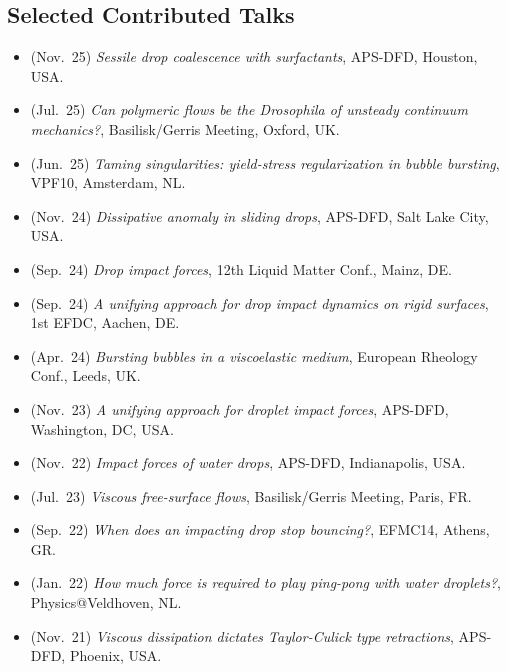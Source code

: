 \documentclass[10pt,a4paper,colorlinks,linkcolor=blue,urlcolor=blue,citecolor=blue]{moderncv}
\begin{document}
\subsection{\faComments\hspace{0.3em}Selected Contributed Talks}
\begin{itemize}[leftmargin=1.5em]
\item[\textbullet] (Nov.~25) \emph{Sessile drop coalescence with surfactants}, APS-DFD, Houston, USA.
\item[\textbullet] (Jul.~25) \emph{Can polymeric flows be the Drosophila of unsteady continuum mechanics?}, Basilisk/Gerris Meeting, Oxford, UK.
\item[\textbullet] (Jun.~25) \emph{Taming singularities: yield-stress regularization in bubble bursting}, VPF10, Amsterdam, NL.
\item[\textbullet] (Nov.~24) \emph{Dissipative anomaly in sliding drops}, APS-DFD, Salt Lake City, USA.
\item[\textbullet] (Sep.~24) \emph{Drop impact forces}, 12th Liquid Matter Conf., Mainz, DE.
\item[\textbullet] (Sep.~24) \emph{A unifying approach for drop impact dynamics on rigid surfaces}, 1st EFDC, Aachen, DE.
\item[\textbullet] (Apr.~24) \emph{Bursting bubbles in a viscoelastic medium}, European Rheology Conf., Leeds, UK.
\item[\textbullet] (Nov.~23) \emph{A unifying approach for droplet impact forces}, APS-DFD, Washington, DC, USA. \href{https://youtu.be/3S_hwkMCx6U?si=01tvC4RHCoga62bC}{\color{red}\faYoutube}
\item[\textbullet] (Nov.~22) \emph{Impact forces of water drops}, APS-DFD, Indianapolis, USA. \href{https://youtu.be/U0g67zV70hw}{\color{red}\faYoutube}
\item[\textbullet] (Jul.~23) \emph{Viscous free-surface flows}, Basilisk/Gerris Meeting, Paris, FR.
\item[\textbullet] (Sep.~22) \emph{When does an impacting drop stop bouncing?}, EFMC14, Athens, GR.
\item[\textbullet] (Jan.~22) \emph{How much force is required to play ping-pong with water droplets?}, Physics@Veldhoven, NL. \href{https://youtu.be/wmEYeQRPi0Q?si=u8Ex64dYLHQ8TxCE}{\color{red}\faYoutube}
\item[\textbullet] (Nov.~21) \emph{Viscous dissipation dictates Taylor-Culick type retractions}, APS-DFD, Phoenix, USA. \href{https://youtu.be/d0tMlpbMIqY?si=V-7Lh5g-zj1j7al6}{\color{red}\faYoutube}

\end{itemize}
\end{document}
